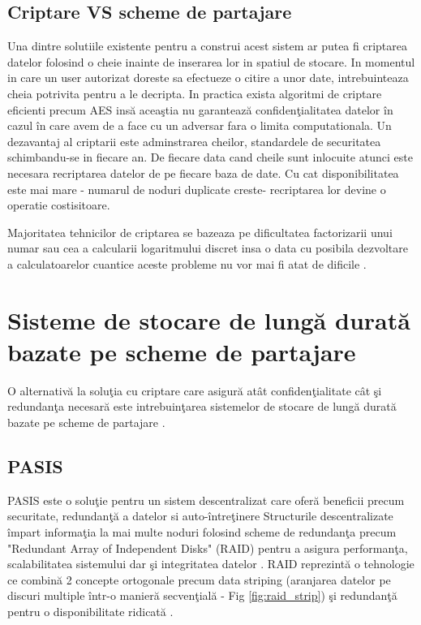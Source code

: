 \documentclass{llncs}
\begin{document}
\subsection{Criptare VS scheme de partajare}


Una dintre solutiile existente pentru a construi acest sistem ar putea fi criptarea datelor folosind o cheie inainte de inserarea lor in spatiul de stocare. In momentul in care un user autorizat doreste sa efectueze o citire a unor date, intrebuinteaza cheia potrivita pentru a le decripta.
In practica exista algoritmi de criptare eficienti precum AES ins\u{a} acea\c{s}tia nu garanteaz\u{a} confiden\c{t}ialitatea datelor \^{i}n cazul \^{i}n care avem de a face cu un adversar fara o limita computationala. Un dezavantaj al criptarii este adminstrarea cheilor, standardele de securitatea schimbandu-se in fiecare an.
De fiecare data cand cheile sunt inlocuite atunci este necesara recriptarea datelor de pe fiecare baza de date. Cu cat disponibilitatea este mai mare - numarul de noduri duplicate creste- recriptarea lor devine o operatie costisitoare. 

Majoritatea tehnicilor de criptarea se bazeaza pe dificultatea factorizarii unui numar sau cea a calcularii logaritmului discret insa o data cu posibila dezvoltare a calculatoarelor cuantice aceste probleme nu vor mai fi atat de dificile \cite{Shor:1994}.



\section{Sisteme de stocare de lung\u{a} durat\u{a} bazate pe scheme de partajare}

O alternativ\u{a} la solu\c{t}ia cu criptare care asigur\u{a} at\^{a}t confiden\c{t}ialitate c\^{a}t \c{s}i redundan\c{t}a necesar\u{a} este intrebuin\c{t}area sistemelor de stocare de lung\u{a} durat\u{a} bazate pe scheme de partajare \cite{W:2000,SB:2005,SGMV:2009}.

\subsection{PASIS}
\label{sec:desc_pasis}
PASIS este o solu\c{t}ie pentru un sistem descentralizat care ofer\u{a} beneficii precum securitate, redundan\c{t}\u{a} a datelor si auto-\^{i}ntre\c{t}inere \cite{W:2000}
Structurile descentralizate \^{i}mpart informa\c{t}ia la mai multe noduri folosind scheme de redundan\c{t}a precum "Redundant Array of Independent Disks" (RAID) pentru a asigura performan\c{t}a, scalabilitatea sistemului dar \c{s}i integritatea datelor \cite{Patterson:1988}.
RAID reprezint\u{a} o tehnologie ce combin\u{a} 2 concepte ortogonale precum data striping (aranjarea datelor pe discuri multiple \^{i}ntr-o manier\u{a} secven\c{t}ial\u{a} - Fig \ref{fig:raid_strip}) \c{s}i redundan\c{t}\u{a} pentru o disponibilitate ridicat\u{a} \cite{Chen:1994}.
\end{document}
